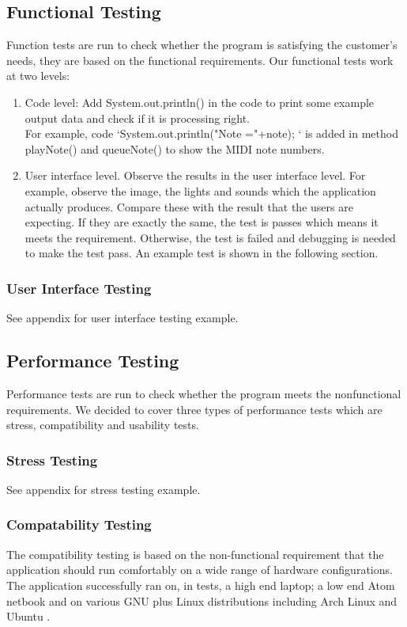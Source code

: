 \documentclass[10pt,a4paper]{article}
\begin{document}
\subsection{Functional Testing}
Function tests are run to check whether the program is satisfying the customer's needs, they are based on the functional requirements. Our functional tests work at two levels:
\begin{enumerate}
\item Code level: Add System.out.println() in the code to print some example output data and check if it is processing right.\\
For example, code ‘System.out.println("Note ="+note); ‘ is added in method playNote() and queueNote() to show the MIDI note numbers.
\item  User interface level. Observe the results in the user interface level. For example, observe the image, the lights and sounds which the application actually produces. Compare these with the result that the users are expecting. If they are exactly the same, the test is passes which means it meets the requirement. Otherwise, the test is failed and debugging is needed to make the test pass. An example test is shown in the following section.
\end{enumerate}

\subsubsection{User Interface Testing}
See appendix for user interface testing example.

\subsection{Performance Testing}
Performance tests are run to check whether the program meets the nonfunctional requirements. We decided to cover three types of performance tests which are stress, compatibility and usability tests.

\subsubsection{Stress Testing}
See appendix for stress testing example.

\subsubsection{Compatability Testing}
The compatibility testing is based on the non-functional requirement that the application should run comfortably on a wide range of hardware configurations. The application successfully ran on, in tests, a high end laptop; a low end Atom netbook and on various GNU plus Linux distributions including Arch Linux and Ubuntu .\\
\end{document}
